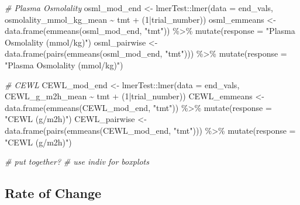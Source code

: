 \documentclass[
]{article}
\newenvironment{Shaded}{\begin{snugshade}}{\end{snugshade}}
\newcommand{\AttributeTok}[1]{\textcolor[rgb]{0.77,0.63,0.00}{#1}}
\newcommand{\CommentTok}[1]{\textcolor[rgb]{0.56,0.35,0.01}{\textit{#1}}}
\newcommand{\DecValTok}[1]{\textcolor[rgb]{0.00,0.00,0.81}{#1}}
\newcommand{\FunctionTok}[1]{\textcolor[rgb]{0.00,0.00,0.00}{#1}}
\newcommand{\NormalTok}[1]{#1}
\newcommand{\OtherTok}[1]{\textcolor[rgb]{0.56,0.35,0.01}{#1}}
\newcommand{\SpecialCharTok}[1]{\textcolor[rgb]{0.00,0.00,0.00}{#1}}
\newcommand{\StringTok}[1]{\textcolor[rgb]{0.31,0.60,0.02}{#1}}
\begin{document}
\begin{Shaded}
\begin{Highlighting}[]
\CommentTok{\# Plasma Osmolality}
\NormalTok{osml\_mod\_end }\OtherTok{\textless{}{-}}\NormalTok{ lmerTest}\SpecialCharTok{::}\FunctionTok{lmer}\NormalTok{(}\AttributeTok{data =}\NormalTok{ end\_vals,}
\NormalTok{                              osmolality\_mmol\_kg\_mean }\SpecialCharTok{\textasciitilde{}}\NormalTok{ tmt }\SpecialCharTok{+} 
\NormalTok{                              (}\DecValTok{1}\SpecialCharTok{|}\NormalTok{trial\_number))}
\NormalTok{osml\_emmeans }\OtherTok{\textless{}{-}} \FunctionTok{data.frame}\NormalTok{(}\FunctionTok{emmeans}\NormalTok{(osml\_mod\_end, }\StringTok{"tmt"}\NormalTok{)) }\SpecialCharTok{\%\textgreater{}\%}
  \FunctionTok{mutate}\NormalTok{(}\AttributeTok{response =} \StringTok{"Plasma Osmolality (mmol/kg)"}\NormalTok{)}
\NormalTok{osml\_pairwise }\OtherTok{\textless{}{-}} \FunctionTok{data.frame}\NormalTok{(}\FunctionTok{pairs}\NormalTok{(}\FunctionTok{emmeans}\NormalTok{(osml\_mod\_end, }\StringTok{"tmt"}\NormalTok{))) }\SpecialCharTok{\%\textgreater{}\%}
  \FunctionTok{mutate}\NormalTok{(}\AttributeTok{response =} \StringTok{"Plasma Osmolality (mmol/kg)"}\NormalTok{)}

\CommentTok{\# CEWL}
\NormalTok{CEWL\_mod\_end }\OtherTok{\textless{}{-}}\NormalTok{ lmerTest}\SpecialCharTok{::}\FunctionTok{lmer}\NormalTok{(}\AttributeTok{data =}\NormalTok{ end\_vals,}
\NormalTok{                              CEWL\_g\_m2h\_mean }\SpecialCharTok{\textasciitilde{}}\NormalTok{ tmt }\SpecialCharTok{+} 
\NormalTok{                              (}\DecValTok{1}\SpecialCharTok{|}\NormalTok{trial\_number))}
\NormalTok{CEWL\_emmeans }\OtherTok{\textless{}{-}} \FunctionTok{data.frame}\NormalTok{(}\FunctionTok{emmeans}\NormalTok{(CEWL\_mod\_end, }\StringTok{"tmt"}\NormalTok{)) }\SpecialCharTok{\%\textgreater{}\%}
  \FunctionTok{mutate}\NormalTok{(}\AttributeTok{response =} \StringTok{"CEWL (g/m2h)"}\NormalTok{)}
\NormalTok{CEWL\_pairwise }\OtherTok{\textless{}{-}} \FunctionTok{data.frame}\NormalTok{(}\FunctionTok{pairs}\NormalTok{(}\FunctionTok{emmeans}\NormalTok{(CEWL\_mod\_end, }\StringTok{"tmt"}\NormalTok{))) }\SpecialCharTok{\%\textgreater{}\%}
  \FunctionTok{mutate}\NormalTok{(}\AttributeTok{response =} \StringTok{"CEWL (g/m2h)"}\NormalTok{)}

\CommentTok{\# put together?}
\CommentTok{\# use indiv for boxplots}
\end{Highlighting}
\end{Shaded}

\hypertarget{rate-of-change}{%
\subsection{Rate of Change}\label{rate-of-change}}
\end{document}
